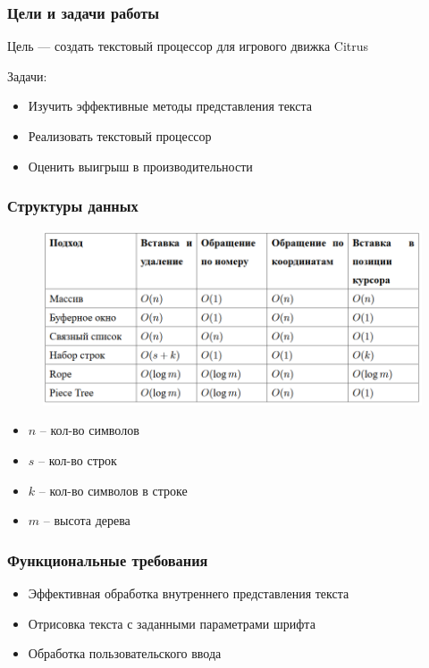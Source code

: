 \documentclass[10pt, unicode]{beamer}
\begin{document}
    \begin{frame}
        \frametitle{Цели и задачи работы}
        Цель --- создать текстовый процессор для игрового движка Citrus
        \vspace{\baselineskip}

        Задачи:
        \begin{itemize}
            \item Изучить эффективные методы представления текста
            \item Реализовать текстовый процессор
            \item Оценить выигрыш в производительности
        \end{itemize}
    \end{frame}
    \begin{frame}
        \frametitle{Структуры данных}
        \begin{figure}
            \centering
            \includegraphics[width=\textwidth]{images/ComparisonTable.png}
        \end{figure}
        \begin{itemize}
            \item $n$ -- кол-во символов
            \item $s$ -- кол-во строк
            \item $k$ -- кол-во символов в строке
            \item $m$ -- высота дерева
        \end{itemize}
    \end{frame}
    \begin{frame}
        \frametitle{Функциональные требования}
        \begin{itemize}
            \item Эффективная обработка внутреннего представления текста
            \item Отрисовка текста с заданными параметрами шрифта
            \item Обработка пользовательского ввода
        \end{itemize}
    \end{frame}
\end{document}
